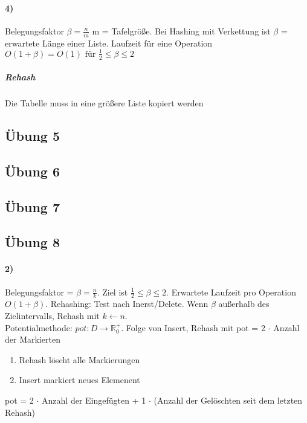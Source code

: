 \paragraph{4)} Belegungsfaktor $ \beta = \frac{n}{m} $ m = Tafelgröße. Bei Hashing mit Verkettung ist $ \beta $ = erwartete Länge einer Liste. Laufzeit für eine Operation $ O(1+\beta) = O(1) \text{ für } \frac{1}{2} \leq \beta \leq 2$ 
\subparagraph{Rehash} Die Tabelle muss in eine größere Liste kopiert werden \\
\begin{algorithm}[H]

\end{algorithm}

\subsection{Übung 5}

\subsection{Übung 6}

\subsection{Übung 7}

\subsection{Übung 8}
\paragraph{2)} Belegungsfaktor = $ \beta = \frac{n}{k} $. Ziel ist $ \frac{1}{2} \leq \beta \leq 2 $. Erwartete Laufzeit pro Operation $ O(1 + \beta) $. Rehashing: Test nach Inerst/Delete. Wenn $ \beta $ außerhalb des Zielintervalls, Rehash mit $ k \gets n $. \\
Potentialmethode: $ pot: D \rightarrow \mathbb{R}^+_0 $. Folge von Insert, Rehash mit pot = 2 $ \cdot $ Anzahl der Markierten
\begin{enumerate}
    \item Rehash löscht alle Markierungen
    \item Insert markiert neues Elemenent
\end{enumerate} 
pot = 2 $ \cdot $ Anzahl der Eingefügten + 1 $ \cdot $ (Anzahl der Gelöschten seit dem letzten Rehash) \\

